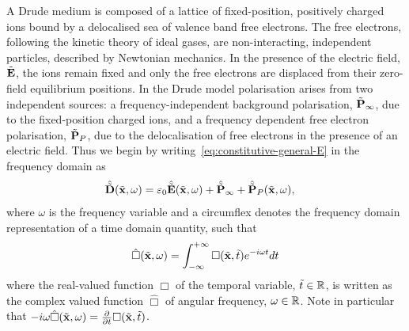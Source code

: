 %
%
A Drude medium is composed of a lattice of fixed-position, positively charged
ions bound by a delocalised sea of valence band free
electrons\cite{Ashcroft:2005wp,Bandyopadhyay:1503732}. The free electrons,
following the kinetic theory of ideal gases, are non-interacting, independent
particles, described by Newtonian mechanics. In the presence of the electric
field, $\tilde{\mathbf{E}}$, the ions remain fixed and only the free electrons are
displaced from their zero-field equilibrium positions. In the Drude model
polarisation arises from two independent sources: a frequency-independent
background polarisation, $\tilde{\mathbf{P}}_{\infty}$, due to the fixed-position charged ions,
and a frequency dependent free electron polarisation, $\tilde{\mathbf{P}}_P$, due to the
delocalisation of free electrons in the presence of an electric field. Thus we
begin by writing~\eqref{eq:constitutive-general-E} in the frequency domain as
\begin{align}
  \hat{\tilde{\mathbf{D}}}(\tilde{\mathbf{x}},\omega) &= \varepsilon_0 \hat{\tilde{\mathbf{E}}}(\tilde{\mathbf{x}}, \omega) + \hat{\tilde{\mathbf{P}}}_{\infty} + \hat{\tilde{\mathbf{P}}}_P(\tilde{\mathbf{x}},\omega) ,
                                    \label{eq:constitutive_equations_drude_model}
\end{align}
where $\omega$ is the frequency variable and a circumflex denotes the frequency
domain representation of a time domain quantity, such that
$$
\hat{\Box}(\tilde{\mathbf{x}},\omega) = \int_{-\infty}^{+\infty} \Box(\tilde{\mathbf{x}},\tilde{t})
e^{-i \omega t} dt
$$
where the real-valued function $\Box$ of the temporal variable, $\tilde{t} \in
\mathbb{R}$, is written as the complex valued function $\hat{\Box}$ of angular
frequency, $\omega \in \mathbb{R}$.
Note in particular that $- i \omega \hat{\Box}(\tilde{\mathbf{x}},\omega) =
\frac{\partial}{\partial t}  \Box(\tilde{\mathbf{x}},\tilde{t})$.

